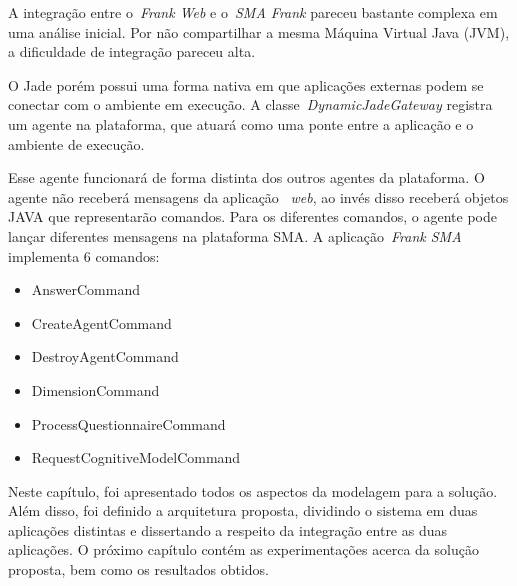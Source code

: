 A integração entre o~\emph{Frank Web} e o~\emph{SMA Frank} pareceu bastante complexa em uma análise inicial. Por não compartilhar a mesma Máquina Virtual Java (JVM), a dificuldade de integração pareceu alta.

O Jade porém possui uma forma nativa em que aplicações externas podem se conectar com o ambiente em execução. A classe~\emph{DynamicJadeGateway} registra um agente na plataforma, que atuará como uma ponte entre a aplicação e o ambiente de execução.

Esse agente funcionará de forma distinta dos outros agentes da plataforma. O agente não receberá mensagens da aplicação ~\emph{web}, ao invés disso receberá objetos JAVA que representarão comandos. Para os diferentes comandos, o agente pode lançar diferentes mensagens na plataforma SMA. A aplicação~\emph{Frank SMA} implementa 6 comandos:

\begin{itemize}
	\item AnswerCommand
	\item CreateAgentCommand
	\item DestroyAgentCommand
	\item DimensionCommand
	\item ProcessQuestionnaireCommand
	\item RequestCognitiveModelCommand
\end{itemize}

Neste capítulo, foi apresentado todos os aspectos da modelagem para a solução. Além disso, foi definido a arquitetura proposta, dividindo o sistema em duas aplicações distintas e dissertando a respeito da integração entre as duas aplicações. O próximo capítulo contém as experimentações acerca da solução proposta, bem como os resultados obtidos.























